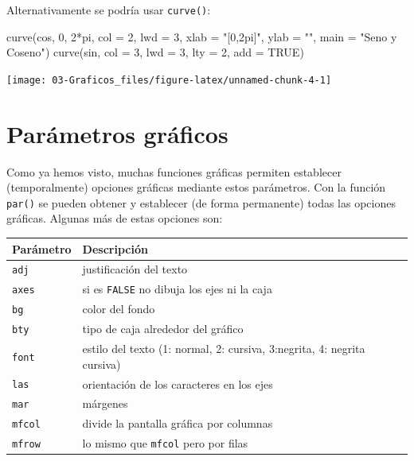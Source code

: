 \documentclass[
]{book}
\newenvironment{Shaded}{\begin{snugshade}}{\end{snugshade}}
\newcommand{\AttributeTok}[1]{\textcolor[rgb]{0.77,0.63,0.00}{#1}}
\newcommand{\ConstantTok}[1]{\textcolor[rgb]{0.00,0.00,0.00}{#1}}
\newcommand{\DecValTok}[1]{\textcolor[rgb]{0.00,0.00,0.81}{#1}}
\newcommand{\FunctionTok}[1]{\textcolor[rgb]{0.00,0.00,0.00}{#1}}
\newcommand{\NormalTok}[1]{#1}
\newcommand{\SpecialCharTok}[1]{\textcolor[rgb]{0.00,0.00,0.00}{#1}}
\newcommand{\StringTok}[1]{\textcolor[rgb]{0.31,0.60,0.02}{#1}}
\theoremstyle{break}
\theoremstyle{nonumberplain}
\begin{document}
Alternativamente se podría usar \texttt{curve()}:

\begin{Shaded}
\begin{Highlighting}[]
\FunctionTok{curve}\NormalTok{(cos, }\DecValTok{0}\NormalTok{, }\DecValTok{2}\SpecialCharTok{*}\NormalTok{pi, }\AttributeTok{col =} \DecValTok{2}\NormalTok{, }\AttributeTok{lwd =} \DecValTok{3}\NormalTok{, }
      \AttributeTok{xlab =} \StringTok{"[0,2pi]"}\NormalTok{, }\AttributeTok{ylab =} \StringTok{""}\NormalTok{, }\AttributeTok{main =} \StringTok{"Seno y Coseno"}\NormalTok{)}
\FunctionTok{curve}\NormalTok{(sin, }\AttributeTok{col =} \DecValTok{3}\NormalTok{, }\AttributeTok{lwd =} \DecValTok{3}\NormalTok{, }\AttributeTok{lty =} \DecValTok{2}\NormalTok{, }\AttributeTok{add =} \ConstantTok{TRUE}\NormalTok{)}
\end{Highlighting}
\end{Shaded}

\begin{center}\texttt{[image: 03-Graficos\_files/figure-latex/unnamed-chunk-4-1]} \end{center}

\hypertarget{bajo-nivel-plot}{%
\section{Parámetros gráficos}\label{bajo-nivel-plot}}

Como ya hemos visto, muchas funciones gráficas permiten establecer (temporalmente) opciones gráficas mediante estos parámetros.
Con la función \texttt{par()} se pueden obtener y establecer (de forma permanente) todas las opciones gráficas.
Algunas más de estas opciones son:

\begin{longtable}[]{@{}
  >{\raggedright\arraybackslash}p{}
  >{\raggedright\arraybackslash}p{}@{}}
\toprule
Parámetro & Descripción \\
\midrule
\endhead
\texttt{adj} & justificación del texto \\
\texttt{axes} & si es \texttt{FALSE} no dibuja los ejes ni la caja \\
\texttt{bg} & color del fondo \\
\texttt{bty} & tipo de caja alrededor del gráfico \\
\texttt{font} & estilo del texto
(1: normal, 2: cursiva, 3:negrita, 4: negrita cursiva) \\
\texttt{las} & orientación de los caracteres en los ejes \\
\texttt{mar} & márgenes \\
\texttt{mfcol} & divide la pantalla gráfica por columnas \\
\texttt{mfrow} & lo mismo que \texttt{mfcol} pero por filas \\
\bottomrule
\end{longtable}
\end{document}

